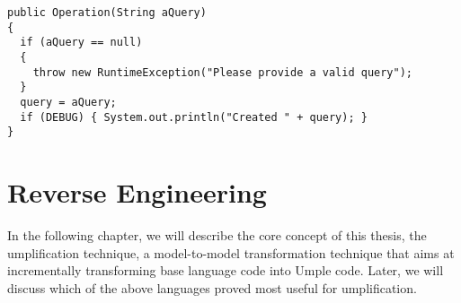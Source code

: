 \begin{lstlisting}[style=java]
public Operation(String aQuery)
{
  if (aQuery == null)  
  {  
    throw new RuntimeException("Please provide a valid query");  
  }
  query = aQuery;
  if (DEBUG) { System.out.println("Created " + query); }
} 
\end{lstlisting}



\section{Reverse Engineering}

In the following chapter, we will describe the core concept of this thesis, the umplification technique, a model-to-model transformation technique that aims at incrementally transforming base language code into Umple code. Later, we will discuss which of the above languages proved most useful for umplification.
